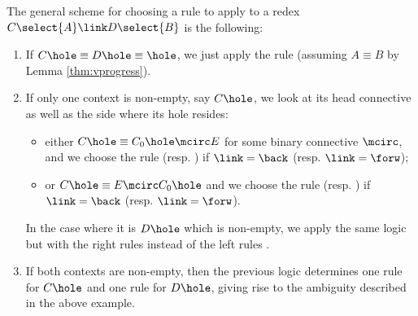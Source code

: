 The general scheme for choosing a rule to apply to a redex $C\select{A} \link
D\select{B}$ is the following:
\begin{enumerate}
  \item If $C\hole \equiv D\hole \equiv \hole$, we just apply the {} rule
  (assuming $A \equiv B$ by Lemma \ref{thm:vprogress}).
  \item If only one context is non-empty, say $C\hole$, we look at its head
  connective as well as the side where its hole resides:
  \begin{itemize}
    \item either $C\hole \equiv C_0\hole \mcirc E$ for some binary connective
    $\mcirc$, and we choose the rule {} (resp.
    {}) if $\link = \back$ (resp. $\link = \forw$);
    \item or $C\hole \equiv E \mcirc C_0\hole$ and we choose the rule
    {} (resp. {}) if $\link = \back$ (resp.
    $\link = \forw$).
  \end{itemize}
  In the case where it is $D\hole$ which is non-empty, we apply the same logic
  but with the right rules {} instead of the left rules
  {}.
  \item If both contexts are non-empty, then the previous logic determines one
  rule for $C\hole$ and one rule for $D\hole$, giving rise to the ambiguity
  described in the above example.
\end{enumerate}
  
